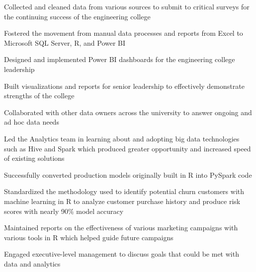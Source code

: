 \documentclass[]{plushcv}
\begin{document}
\begin{minipage}[t]{0.70\textwidth}
\begin{tightemize}
\sectionsep
\item Collected and cleaned data from various sources to
submit to critical surveys for the continuing success of the
engineering college
\item Fostered the movement from manual data processes and
reports from Excel to Microsoft SQL Server, R, and Power
BI
\item Designed and implemented Power BI dashboards for the
engineering college leadership
\item Built visualizations and reports for senior leadership to
effectively demonstrate strengths of the college
\item Collaborated with other data owners across the university
to answer ongoing and ad hoc data needs
\end{tightemize}
\sectionsep

\begin{tightemize}
\sectionsep
\item Led the Analytics team in learning about and adopting
big data technologies such as Hive and Spark which
produced greater opportunity and increased speed of
existing solutions
\item Successfully converted production models originally
built in R into PySpark code
\item Standardized the methodology used to identify potential
churn customers with machine learning in R to analyze
customer purchase history and produce risk scores with
nearly 90\% model accuracy
\item Maintained reports on the effectiveness of various
marketing campaigns with various tools in R which
helped guide future campaigns
\item Engaged executive-level management to discuss
goals that could be met with data and analytics
\end{tightemize}
\sectionsep

%
%

\end{minipage} 
\hfill
\end{document}
